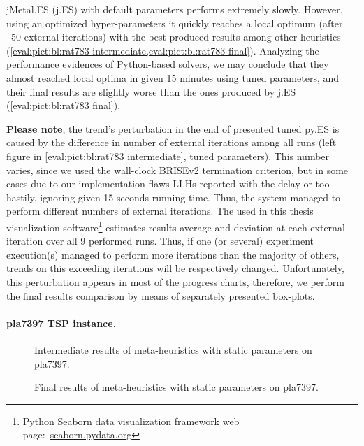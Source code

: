 jMetal.ES (j.ES) with default parameters performs extremely slowly. However, using an optimized hyper-parameters it quickly reaches a local optimum (after ~50 external iterations) with the best produced results among other heuristics (\cref{eval:pict:bl:rat783 intermediate,eval:pict:bl:rat783 final}). Analyzing the performance evidences of Python-based solvers, we may conclude that they almost reached local optima in given 15 minutes using tuned parameters, and their final results are slightly worse than the ones produced by j.ES (\cref{eval:pict:bl:rat783 final}).

\textbf{Please note}, the trend's perturbation in the end of presented tuned py.ES is caused by the difference in number of external iterations among all runs (left figure in \cref{eval:pict:bl:rat783 intermediate}, tuned parameters). This number varies, since we used the wall-clock BRISEv2 termination criterion, but in some cases due to our implementation flaws LLHs reported with the delay or too hastily, ignoring given 15 seconds running time. Thus, the system managed to perform different numbers of external iterations. The used in this thesis visualization software\footnote{Python Seaborn data visualization framework web page:~\href{https://seaborn.pydata.org/}{seaborn.pydata.org}} estimates results average and deviation at each external iteration over all 9 performed runs. Thus, if one (or several) experiment execution(s) managed to perform more iterations than the majority of others, trends on this exceeding iterations will be respectively changed. Unfortunately, this perturbation appears in most of the progress charts, therefore, we perform the final results comparison by means of separately presented box-plots.


\paragraph{pla7397 TSP instance.} 

\begin{figure}[b]
	\centering
	\vspace{-20pt}
	
	\caption{Intermediate results of meta-heuristics with static parameters on pla7397.}
	\vspace{-5pt}
	\label{eval:pict:bl:pla7397 intermediate}
\end{figure}

\begin{wrapfigure}{R}{0.5\textwidth}%
	\centering
	
	\label{eval:pict:bl:pla7397 final}
	\caption{Final results of meta-heuristics with static parameters on pla7397.}
	\vspace{-10pt}
\end{wrapfigure}

